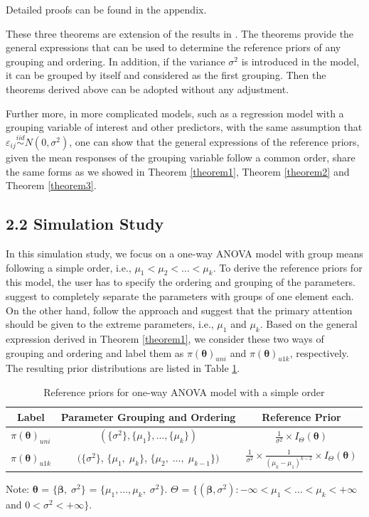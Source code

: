 \documentclass[Proceedings]{ascelike}
\begin{document}
Detailed proofs can be found in the appendix. 

These three theorems are extension of the results in
\cite{Sonksen2012}. The theorems provide the general expressions that
can be used to determine the reference priors of any grouping and
ordering. In addition, if the variance $\sigma^2$ is introduced in the
model, it can be grouped by itself and considered as the first
grouping. Then the theorems derived above can be adopted without any
adjustment.


Further more, in more complicated models, such as a regression model
with a grouping variable of interest and other predictors, with the
same assumption that
$\varepsilon_{ij}\overset{iid}{\sim}N(0,\sigma^2)$, one can show that
the general expressions of the reference priors, given the mean
responses of the grouping variable follow a common order, share the
same forms as we showed in Theorem \ref{theorem1}, Theorem
\ref{theorem2} and Theorem \ref{theorem3}.
\subsection{2.2 Simulation Study}
In this simulation study, we focus on a one-way ANOVA model with group
means following a simple order, i.e., $\mu_1<\mu_2<\hdots<\mu_k$. To
derive the reference priors for this model, the user has to specify
the ordering and grouping of the parameters. \cite{BergerBernardo1992}
suggest to completely separate the parameters with groups of one
element each. On the other hand, \cite{Sonksen2012} follow the
\cite{NichollsJones} approach and suggest that the primary attention
should be given to the extreme parameters, i.e., $\mu_1$ and
$\mu_k$. Based on the general expression derived in Theorem
\ref{theorem1}, we consider these two ways of grouping and ordering
and label them as $\pi(\pmb\theta)_{uni}$ and $\pi(\pmb\theta)_{u1k}$,
respectively. The resulting prior distributions are listed in Table
\ref{tab:ref}.
\begin{table}[h!]
\centering
\begin{threeparttable}
\caption{Reference priors for one-way ANOVA model with a simple order}
\begin{tabular}{c|c|c}
\multirow{1}{*}{Label}&Parameter Grouping and Ordering&Reference
Prior\\ \hline
\multirow{1}{*}{$\pi(\pmb\theta)_{uni}$}&$(\{\sigma^2\}, \{\mu_1\},
\hdots, \{\mu_k\})$&$\frac{1}{\sigma^2}\times
I_{\Theta}(\boldsymbol{\theta})$\\ \multirow{1}{*}{$\pi(\pmb\theta)_{u1k}$}&$(\{\sigma^2\}$,
$\{\mu_1,\;\mu_k\}$, $\{\mu_2,\; \hdots,\;
\mu_{k-1}\})$&$\frac{1}{\sigma^2}\times\frac{1}{{(\mu_k-\mu_1)}^{k-2}}\times
I_{\Theta}(\boldsymbol{\theta})$
\end{tabular}
\begin{tablenotes}
\item Note: $\pmb\theta$ = $\{\pmb\beta,\;\sigma^2\}$ = $\{\mu_1,\hdots,\mu_k,\;\sigma^2\}$. $\Theta$ = $\{(\pmb\beta,\sigma^2) : -\infty<\mu_1<\hdots<\mu_k< +\infty $ and $0<\sigma^2< +\infty \}$.
\end{tablenotes}
\label{tab:ref}
\end{threeparttable}
\end{table}
\end{document}
